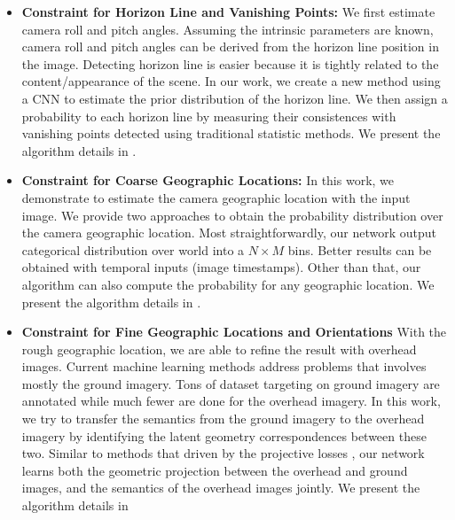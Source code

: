 \begin{itemize}[noitemsep]
  \item \textbf{Constraint for Horizon Line and Vanishing Points:}
  We first estimate camera roll and pitch angles. Assuming the intrinsic
  parameters are known, camera roll and pitch angles can be
  derived from the horizon line position in the image. Detecting horizon
  line is easier because it is tightly related to the content/appearance
  of the scene. In our work, we create a new method using a CNN to
  estimate the prior distribution of the horizon line. We then assign
  a probability to each horizon line by measuring their consistences
  with vanishing points detected using traditional statistic methods.
  We present the algorithm details in .
  \newline

  \item \textbf{Constraint for Coarse Geographic Locations:}
  In this work, we demonstrate to estimate the camera geographic
  location with the input image.
  We provide two approaches to obtain the probability distribution over the camera
  geographic location. Most straightforwardly, our network output
  categorical distribution over world into a $N \times M$ bins. Better
  results can be obtained with temporal inputs (image timestamps). Other
  than that, our algorithm can also compute the probability for any
  geographic location.
  We present the algorithm details in .
  \newline

  \item \textbf{Constraint for Fine Geographic Locations and Orientations}
  With the rough geographic location, we are able to refine the result
  with overhead images.
  Current machine learning methods address problems that involves mostly
  the ground imagery. Tons of dataset targeting on ground imagery are
  annotated while much fewer are done for the overhead imagery.
  In this work, we try to transfer the semantics from the ground imagery
  to the overhead imagery by identifying the latent geometry
  correspondences between these two. Similar to methods that driven by
  the projective losses , our network learns 
  both the geometric projection between the overhead and ground
  images, and the semantics of the overhead images jointly. 
  We present the algorithm details in 
  \newline

\end{itemize}
